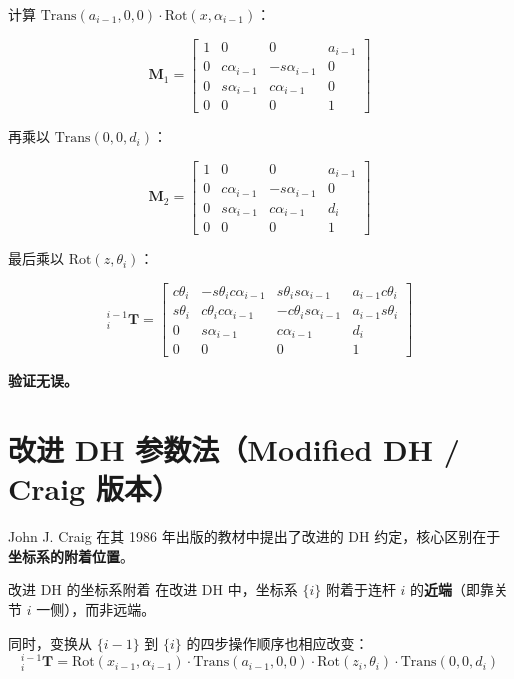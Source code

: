 计算 $\mathrm{Trans}(a_{i-1},0,0) \cdot \mathrm{Rot}(x,\alpha_{i-1})$：

\[
\mathbf{M}_1 = \begin{bmatrix}
	1 & 0          & 0           & a_{i-1} \\
	0 & c\alpha_{i-1} & -s\alpha_{i-1} & 0 \\
	0 & s\alpha_{i-1} &  c\alpha_{i-1} & 0 \\
	0 & 0          & 0           & 1
\end{bmatrix}
\]

再乘以 $\mathrm{Trans}(0,0,d_i)$：

\[
\mathbf{M}_2 = \begin{bmatrix}
	1 & 0          & 0           & a_{i-1} \\
	0 & c\alpha_{i-1} & -s\alpha_{i-1} & 0 \\
	0 & s\alpha_{i-1} &  c\alpha_{i-1} & d_i \\
	0 & 0          & 0           & 1
\end{bmatrix}
\]

最后乘以 $\mathrm{Rot}(z,\theta_i)$：

\[
{}^{i-1}_{i}\mathbf{T} = \begin{bmatrix}
	c\theta_i & -s\theta_i c\alpha_{i-1} &  s\theta_i s\alpha_{i-1} & a_{i-1} c\theta_i \\
	s\theta_i &  c\theta_i c\alpha_{i-1} & -c\theta_i s\alpha_{i-1} & a_{i-1} s\theta_i \\
	0         &  s\alpha_{i-1}           &  c\alpha_{i-1}           & d_i \\
	0         &  0                      &  0                        & 1
\end{bmatrix}
\]

\textbf{验证无误。}

\section{改进 DH 参数法（Modified DH / Craig 版本）}

John J. Craig 在其 1986 年出版的教材中提出了改进的 DH 约定，核心区别在于\textbf{坐标系的附着位置}。

\begin{mydefinition}{改进 DH 的坐标系附着}
	在改进 DH 中，坐标系 $\{i\}$ 附着于连杆 $i$ 的\textbf{近端}（即靠关节 $i$ 一侧），而非远端。
	
	同时，变换从 $\{i-1\}$ 到 $\{i\}$ 的四步操作顺序也相应改变：
	\[
	{}^{i-1}_{i}\mathbf{T} = \mathrm{Rot}(x_{i-1}, \alpha_{i-1}) \cdot \mathrm{Trans}(a_{i-1},0,0) \cdot \mathrm{Rot}(z_i, \theta_i) \cdot \mathrm{Trans}(0,0,d_i)
	\]
\end{mydefinition}

